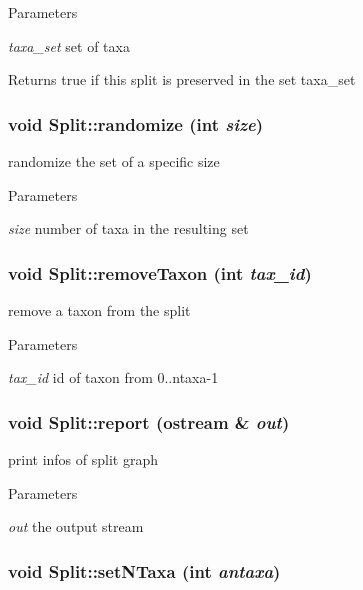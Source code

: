 \begin{DoxyParams}{Parameters}
\item[{\em taxa\_\-set}]set of taxa \end{DoxyParams}
\begin{DoxyReturn}{Returns}
true if this split is preserved in the set taxa\_\-set 
\end{DoxyReturn}
\hypertarget{classSplit_aba2bc06ac8b0864cd7210e181de41275}{
\subsubsection[{randomize}]{\setlength{\rightskip}{0pt plus 5cm}void Split::randomize (int {\em size})}}
\label{classSplit_aba2bc06ac8b0864cd7210e181de41275}
randomize the set of a specific size 
\begin{DoxyParams}{Parameters}
\item[{\em size}]number of taxa in the resulting set \end{DoxyParams}
\hypertarget{classSplit_a35df7b8abdab57e1a8a097909a125396}{
\subsubsection[{removeTaxon}]{\setlength{\rightskip}{0pt plus 5cm}void Split::removeTaxon (int {\em tax\_\-id})}}
\label{classSplit_a35df7b8abdab57e1a8a097909a125396}
remove a taxon from the split 
\begin{DoxyParams}{Parameters}
\item[{\em tax\_\-id}]id of taxon from 0..ntaxa-\/1 \end{DoxyParams}
\hypertarget{classSplit_a62f6f9dd6849b2e3b5f4ff8d1a3131fd}{
\subsubsection[{report}]{\setlength{\rightskip}{0pt plus 5cm}void Split::report (ostream \& {\em out})}}
\label{classSplit_a62f6f9dd6849b2e3b5f4ff8d1a3131fd}
print infos of split graph 
\begin{DoxyParams}{Parameters}
\item[{\em out}]the output stream \end{DoxyParams}
\hypertarget{classSplit_a2d5be14eadb830619216ef12ddd512e7}{
\subsubsection[{setNTaxa}]{\setlength{\rightskip}{0pt plus 5cm}void Split::setNTaxa (int {\em antaxa})}}
